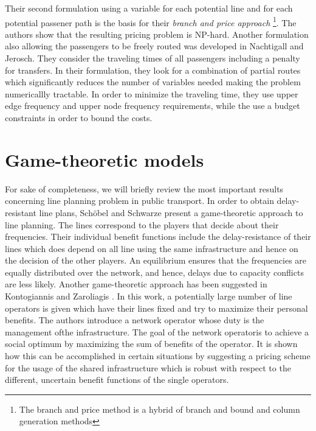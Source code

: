 \documentclass[
  twoside,
  11pt, a4paper,
  footinclude=true,
  headinclude=true,
  cleardoublepage=empty
]{book}
\theoremstyle{definition}
\begin{document}
Their second formulation using a variable for each potential line and for each potential passener path is the basis for their \emph{branch and price approach} \footnote{The branch and price method is a hybrid of branch and bound and column generation methods}. The authors show that the resulting pricing problem is NP-hard. \newline
Another formulation also allowing the passengers to be freely routed was developed in Nachtigall and Jerosch. They consider the traveling times of all passengers including a penalty for transfers. In their formulation, they look for a combination of partial routes which significantly reduces the number of variables needed making the problem numericallly tractable. In order to minimize the traveling time, they use upper edge frequency and upper node frequency requirements, while the use a budget constraints in order to bound the costs. \newline

\section{Game-theoretic models}
For sake of completeness, we will briefly review the most important results concerning line planning problem in public transport. \newline
In order to obtain delay-resistant line plans, Sch\"{o}bel and Schwarze \cite{schbel_et_al:inpro}present a game-theoretic approach to line planning. The lines correspond to the players that decide about their frequencies. Their individual benefit functions include the delay-resistance of their lines which does depend on all line using the same infrastructure and hence on the decision of the other players. An equilibrium ensures that the frequencies are equally distributed over the network, and hence, delays due to capacity conflicts are less likely. \newline
Another game-theoretic approach has been suggested in Kontogiannis and Zaroliagis \cite{kontogiannis_et_al:inpro}. In this work, a potentially large number of line operators is given which have their lines fixed and try to maximize their personal benefits. The authors introduce a network operator whose duty is the management ofthe infrastructure. The goal of the network operatoris to achieve a social optimum by maximizing the sum of benefits of the operator. It is shown how this can be accomplished in certain situations by suggesting a pricing scheme for the usage of the shared infrastructure which is robust with respect to the different, uncertain benefit functions of the single operators.
\end{document}
